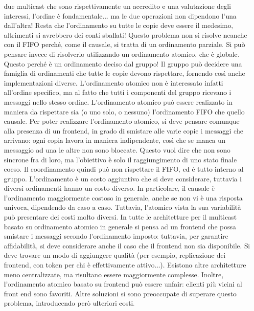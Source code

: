 due multicast che sono rispettivamente un accredito e una valutazione degli interessi, l'ordine è fondamentale... ma
le due operazioni non dipendono l'una dall'altra! Resta che l'ordinamento su tutte le copie deve essere il medesimo,
altrimenti si avrebbero dei conti sballati!
Questo problema non si risolve neanche con il FIFO perché, come il causale, si tratta di un ordinamento parziale. Si
può pensare invece di risolverlo utilizzando un ordinamento atomico, che è globale. Questo perché è un ordinamento
deciso dal gruppo! Il gruppo può decidere una famiglia di ordinamenti che tutte le copie devono rispettare, fornendo
così anche implementazioni diverse. L'ordinamento atomico non è interessato infatti all'ordine specifico, ma al fatto
che tutti i componenti del gruppo ricevano i messaggi nello stesso ordine. L'ordinamento atomico può essere realizzato
in maniera da rispettare sia (o uno solo, o nessuno) l'ordinamento FIFO che quello causale.
Per poter realizzare l'ordinamento atomico, si deve pensare comunque alla presenza di un frontend, in grado di smistare
alle varie copie i messaggi che arrivano: ogni copia lavora in maniera indipendente, così che se manca un messaggio
ad una le altre non sono bloccate. Questo vuol dire che non sono sincrone fra di loro, ma l'obiettivo è solo il
raggiungimento di uno stato finale coeso. Il coordinamento quindi può non rispettare il FIFO, ed è tutto interno al
gruppo.
L'ordinamento è un costo aggiuntivo che si deve considerare, tuttavia i diversi ordinamenti hanno un costo diverso.
In particolare, il causale è l'ordinamento maggiormente costoso in generale, anche se non vi è una risposta univoca,
dipendendo da caso a caso. Tuttavia, l'atomico vista la sua variabilità può presentare dei costi molto diversi.
In tutte le architetture per il multicast basato su ordinamento atomico in generale si pensa ad un frontend che possa
smistare i messaggi secondo l'ordinamento imposto: tuttavia, per garantire affidabilità, si deve considerare anche il
caso che il frontend non sia disponibile. Si deve trovare un modo di aggiungere qualità (per esempio, replicazione dei
frontend, con token per chi è effettivamente attivo...). Esistono altre architetture meno centralizzate, ma risultano
essere maggiormente complesse.
Inoltre, l'ordinamento atomico basato su frontend può essere unfair: clienti più vicini al front end sono favoriti.
Altre soluzioni si sono preoccupate di superare questo problema, introducendo però ulteriori costi.
